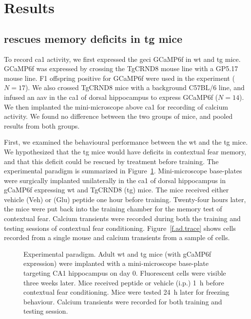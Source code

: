 \section{Results}


\subsection{\tglu{} rescues memory deficits in \gls{tg} mice}

To record \gls{ca1} activity, we first expressed the \gls{geci} GCaMP6f in \gls{wt} and \gls{tg} mice. GCaMP6f was expressed by crossing the TgCRND8 mouse line with a GP5.17 mouse line. F1 offspring positive for GCaMP6f were used in the experiment ($N=17$). We also crossed TgCRND8 mice with a background C57BL/6 line, and infused an \gls{aav} in the \gls{ca1} of dorsal hippocampus to express GCaMP6f ($N=14$). We then implanted the mini-microscope above \gls{ca1} for recording of calcium activity. We found no difference between the two groups of mice, and pooled results from both groups. 

First, we examined the behavioural performance between the \gls{wt} and the \gls{tg} mice. We hypothesized that the \gls{tg} mice would have deficits in contextual fear memory, and that this deficit could be rescued by \tglu{} treatment before training.  The experimental paradigm is summarized in Figure~\ref{f.ad.paradigm}. Mini-microscope base-plates were surgically implanted unilaterally in the \gls{ca1} of dorsal hippocampus in gCaMP6f expressing \gls{wt} and TgCRND8 (\gls{tg}) mice. The mice received either vehicle (Veh) or \tglu{} (Glu) peptide one hour before training. Twenty-four hours later, the mice were put back into the training chamber for the memory test of contextual fear. Calcium transients were recorded during both the training and testing sessions of contextual fear conditioning. Figure~\ref{f.ad.trace} shows cells recorded from a single mouse and calcium transients from a sample of cells.
\begin{figure}[h]
    
    \caption[Experimental paradigm for contextual fear conditioning.]{Experimental paradigm. Adult \gls{wt} and \gls{tg} mice (with gCaMP6f expression) were implanted with a mini-microscope base-plate targeting CA1 hippocampus on day 0. Fluorescent cells were visible three weeks later. Mice received \tglu{} peptide or vehicle (i.p.) \SI{1}{\hour} before contextual fear conditioning. Mice were tested \SI{24}{\hour} later for freezing behaviour. Calcium transients were recorded for both training and testing session. \label{f.ad.paradigm}}
\end{figure}

